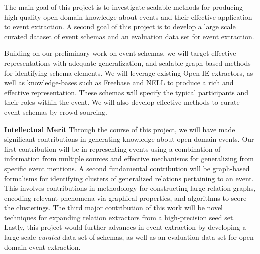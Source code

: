 The main goal of this project is to investigate scalable methods for producing high-quality open-domain knowledge about events and their effective application to event extraction. A second goal of this project is to develop a large scale curated dataset of event schemas and an evaluation data set for event extraction. 

Building on our preliminary work on event schemas, we will target effective representations with adequate generalization, and scalable graph-based methods for identifying schema elements. We will leverage existing Open IE extractors, as well as knowledge-bases such as Freebase and NELL to produce a rich and effective representation. These schemas will specify the typical participants and their roles within the event. We will also develop effective methods to curate event schemas by crowd-sourcing. 

{\bf Intellectual Merit} Through the course of this project, we will have made significant contributions in generating knowledge about open-domain events. Our first contribution will be in representing events using a combination of information from multiple sources and effective mechanisms for generalizing from specific event mentions. A second fundamental contribution will be graph-based formalisms for identifying clusters of generalized relations pertaining to an event. This involves contributions in methodology for constructing large relation graphs, encoding relevant phenomena via graphical properties, and algorithms to score the clusterings. The third major contribution of this work will be novel techniques for expanding relation extractors from a high-precision seed set. Lastly, this project would further advances in event extraction by developing a large scale {\em curated} data set of schemas, as well as an evaluation data set for open-domain event extraction. 


